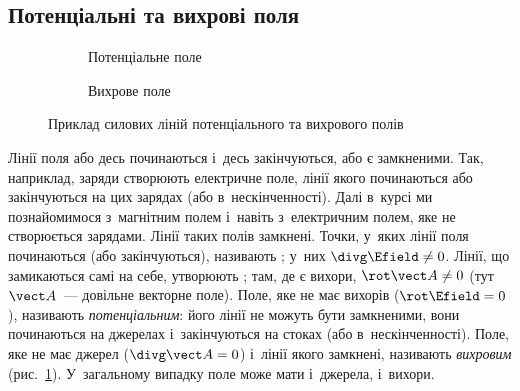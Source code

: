 \subsection*{Потенціальні та вихрові поля}



\begin{figure}[h!]\centering
	\begin{subfigure}[t]{0.45\linewidth}\centering
		\caption{Потенціальне поле}
	\end{subfigure}
	\begin{subfigure}[t]{0.45\linewidth}\centering
		\caption{Вихрове поле}
	\end{subfigure}
	\caption{Приклад силових ліній потенціального та вихрового полів}
	\label{tikz:source_and_curl_field}
\end{figure}

Лінії поля або десь починаються і~десь закінчуються, або є замкненими. Так, наприклад,
заряди створюють електричне поле, лінії якого починаються або закінчуються на цих зарядах
(або в~нескінченності). Далі в~курсі ми познайомимося з~магнітним полем і~навіть
з~електричним полем, яке не створюється зарядами. Лінії таких полів замкнені. Точки,
у~яких лінії поля починаються (або закінчуються), називають ; у~них $\divg\Efield \neq 0$. Лінії, що замикаються самі на себе, утворюють
; там, де є вихори, $\rot\vect A \neq 0$ (тут $\vect A$~--- довільне векторне поле). Поле, яке не має
вихорів ($\rot\Efield = 0$), називають \emph{потенціальним}: його лінії не можуть бути
замкненими, вони починаються на джерелах і~закінчуються на стоках (або в~нескінченності).
Поле, яке не має джерел ($\divg\vect A = 0$) і~лінії якого замкнені, називають \emph{вихровим}
(рис.~\ref{tikz:source_and_curl_field}). У~загальному випадку поле може мати і~джерела,
і~вихори.

